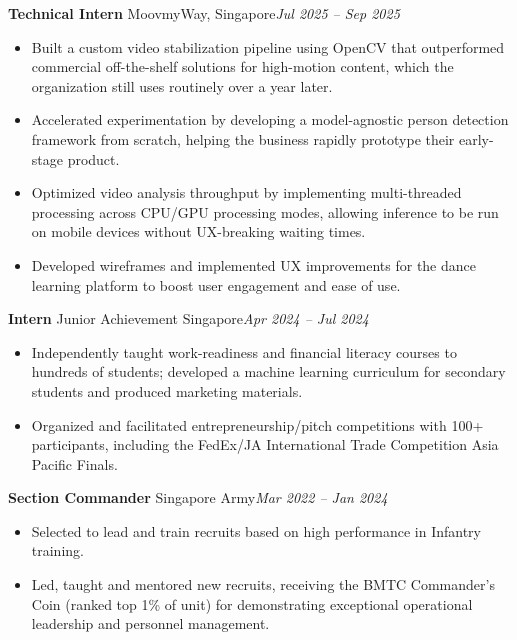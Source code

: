 \documentclass[11pt]{article}
\begin{document}
\vspace{4pt}
\noindent\textbf{Technical Intern} MoovmyWay, Singapore\hfill\textit{Jul 2025 -- Sep 2025}\par
\begin{itemize}
  \item Built a custom video stabilization pipeline using OpenCV that outperformed commercial off-the-shelf solutions for high-motion content, which the organization still uses routinely over a year later.
  \item Accelerated experimentation by developing a model-agnostic person detection framework from scratch, helping the business rapidly prototype their early-stage product.
  \item Optimized video analysis throughput by implementing multi-threaded processing across CPU/GPU processing modes, allowing inference to be run on mobile devices without UX-breaking waiting times.
  \item Developed wireframes and implemented UX improvements for the dance learning platform to boost user engagement and ease of use.
\end{itemize}

\vspace{4pt}
\noindent\textbf{Intern} Junior Achievement Singapore\hfill\textit{Apr 2024 -- Jul 2024}\par
\begin{itemize}
  \item Independently taught work-readiness and financial literacy courses to hundreds of students; developed a machine learning curriculum for secondary students and produced marketing materials.
  \item Organized and facilitated entrepreneurship/pitch competitions with 100+ participants, including the FedEx/JA International Trade Competition Asia Pacific Finals.
\end{itemize}

\vspace{4pt}
\noindent\textbf{Section Commander} Singapore Army\hfill\textit{Mar 2022 -- Jan 2024}\par
\begin{itemize}
  \item Selected to lead and train recruits based on high performance in Infantry training.
  \item Led, taught and mentored new recruits, receiving the BMTC Commander's Coin (ranked top 1\% of unit) for demonstrating exceptional operational leadership and personnel management.
\end{itemize}
\end{document}
